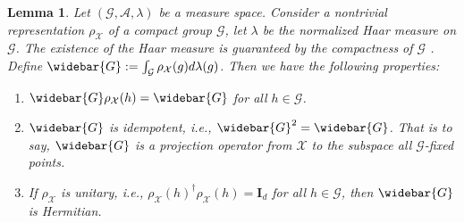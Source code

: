 \documentclass{article}
\theoremstyle{plain}
\newtheorem{lemma}[theorem]{Lemma}
\theoremstyle{definition}
\theoremstyle{remark}
\theoremstyle{remark}
\begin{document}
  \begin{lemma} \label{lemma:group_average_properties}
    Let $(\mathcal{G}, \mathcal{A}, \lambda)$ be a measure space. Consider a nontrivial representation $\rho_{\mathcal{X}}$ of a compact group $\mathcal{G}$, let $\lambda$ be the normalized Haar measure on $\mathcal{G}$. The existence of the Haar measure is guaranteed by the compactness of $\mathcal{G}$ \citep{bourbaki04}. Define $\widebar{G} := \int_{\mathcal{G}}\rho_{\mathcal{X}}(g) d\lambda(g)$. Then we have the following properties:
    \begin{enumerate}
      \item $\widebar{G} \rho_{\mathcal{X}}(h) =  \widebar{G}$ for all $h \in \mathcal{G}$.
      \item $\widebar{G}$ is idempotent, i.e., $\widebar{G}^2 = \widebar{G}$. That is to say, $\widebar{G}$ is a projection operator from $\mathcal{X}$ to the subspace all $\mathcal{G}$-fixed points.
      \item If $\rho_{\mathcal{X}}$ is unitary, i.e., $\rho_{\mathcal{X}}(h)^{\dagger} \rho_{\mathcal{X}}(h) = \mathbf{I}_d$ for all $h \in \mathcal{G}$, then $\widebar{G}$ is Hermitian.
    \end{enumerate}
  \end{lemma}
\end{document}
